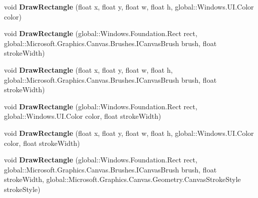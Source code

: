 \begin{DoxyCompactItemize}
void {\bfseries Draw\+Rectangle} (float x, float y, float w, float h, global\+::\+Windows.\+U\+I.\+Color color)
\item 
\mbox{\label{interface_microsoft_1_1_graphics_1_1_canvas_1_1_i_canvas_drawing_session_a7244fdf7597b47d3d572630ac2278744}} 
void {\bfseries Draw\+Rectangle} (global\+::\+Windows.\+Foundation.\+Rect rect, global\+::\+Microsoft.\+Graphics.\+Canvas.\+Brushes.\+I\+Canvas\+Brush brush, float stroke\+Width)
\item 
\mbox{\label{interface_microsoft_1_1_graphics_1_1_canvas_1_1_i_canvas_drawing_session_a21da7f5afc57a55caeb353c50f1e79c8}} 
void {\bfseries Draw\+Rectangle} (float x, float y, float w, float h, global\+::\+Microsoft.\+Graphics.\+Canvas.\+Brushes.\+I\+Canvas\+Brush brush, float stroke\+Width)
\item 
\mbox{\label{interface_microsoft_1_1_graphics_1_1_canvas_1_1_i_canvas_drawing_session_a2a30c4db1b017bd35354d76a06fffd0d}} 
void {\bfseries Draw\+Rectangle} (global\+::\+Windows.\+Foundation.\+Rect rect, global\+::\+Windows.\+U\+I.\+Color color, float stroke\+Width)
\item 
\mbox{\label{interface_microsoft_1_1_graphics_1_1_canvas_1_1_i_canvas_drawing_session_a3633aafe8dc2c5aa03e05c858a1b0802}} 
void {\bfseries Draw\+Rectangle} (float x, float y, float w, float h, global\+::\+Windows.\+U\+I.\+Color color, float stroke\+Width)
\item 
\mbox{\label{interface_microsoft_1_1_graphics_1_1_canvas_1_1_i_canvas_drawing_session_a298251ae7a182d7041d97d9da8758781}} 
void {\bfseries Draw\+Rectangle} (global\+::\+Windows.\+Foundation.\+Rect rect, global\+::\+Microsoft.\+Graphics.\+Canvas.\+Brushes.\+I\+Canvas\+Brush brush, float stroke\+Width, global\+::\+Microsoft.\+Graphics.\+Canvas.\+Geometry.\+Canvas\+Stroke\+Style stroke\+Style)
\item 
\mbox{\label{interface_microsoft_1_1_graphics_1_1_canvas_1_1_i_canvas_drawing_session_ae3c965e98ad619649d1740114ea65691}} 

\end{DoxyCompactItemize}
